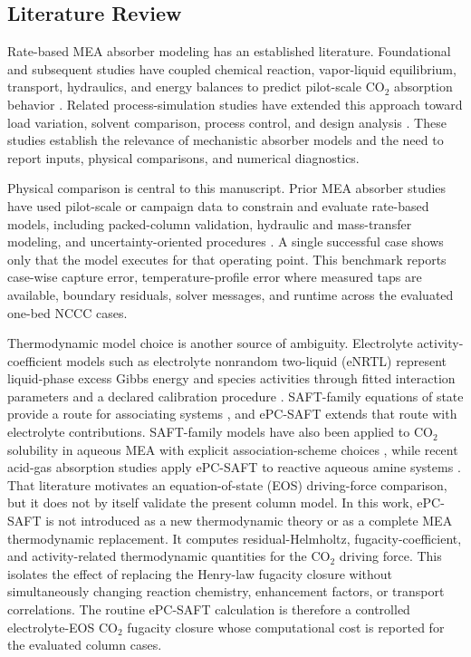         \subsection{Literature Review}

        Rate-based MEA absorber modeling has an established literature. Foundational and subsequent studies have coupled chemical reaction, vapor-liquid equilibrium, transport, hydraulics, and energy balances to predict pilot-scale CO$_2$ absorption behavior \cite{Freguia2003,Mores2012,Zhang2009}. Related process-simulation studies have extended this approach toward load variation, solvent comparison, process control, and design analysis \cite{Moioli2012,Harun2012a,Greer2008,Rodriguez2014}. These studies establish the relevance of mechanistic absorber models and the need to report inputs, physical comparisons, and numerical diagnostics.

        Physical comparison is central to this manuscript. Prior MEA absorber studies have used pilot-scale or campaign data to constrain and evaluate rate-based models, including packed-column validation, hydraulic and mass-transfer modeling, and uncertainty-oriented procedures \cite{Razi2013,Chinen2018,Morgan2018,Morgan2020}. A single successful case shows only that the model executes for that operating point. This benchmark reports case-wise capture error, temperature-profile error where measured taps are available, boundary residuals, solver messages, and runtime across the evaluated one-bed NCCC cases.

        Thermodynamic model choice is another source of ambiguity. Electrolyte activity-coefficient models such as electrolyte nonrandom two-liquid (eNRTL) represent liquid-phase excess Gibbs energy and species activities through fitted interaction parameters and a declared calibration procedure \cite{Zhang2011}. SAFT-family equations of state provide a route for associating systems \cite{Gross2001,Cameretti2005}, and ePC-SAFT extends that route with electrolyte contributions. SAFT-family models have also been applied to CO$_2$ solubility in aqueous MEA with explicit association-scheme choices \cite{Baygi2015,Najafloo2018}, while recent acid-gas absorption studies apply ePC-SAFT to reactive aqueous amine systems \cite{Cleeton2020,Bulow2021a}. That literature motivates an equation-of-state (EOS) driving-force comparison, but it does not by itself validate the present column model. In this work, ePC-SAFT is not introduced as a new thermodynamic theory or as a complete MEA thermodynamic replacement. It computes residual-Helmholtz, fugacity-coefficient, and activity-related thermodynamic quantities for the CO$_2$ driving force. This isolates the effect of replacing the Henry-law fugacity closure without simultaneously changing reaction chemistry, enhancement factors, or transport correlations. The routine ePC-SAFT calculation is therefore a controlled electrolyte-EOS CO$_2$ fugacity closure whose computational cost is reported for the evaluated column cases.


